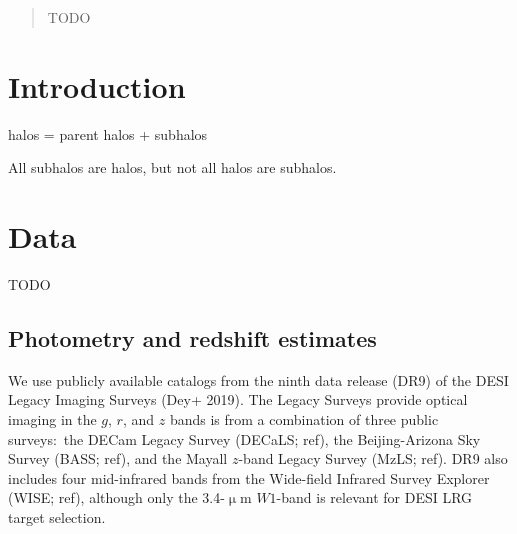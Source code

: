 \documentclass[twocolumn,apj,iop,tighten]{emulateapj2}
\begin{document}
\title{}

\author{Angela M.\ Berti,
}
	

\begin{abstract}
TODO
\end{abstract}

\section{Introduction}\label{sec:intro}

halos = parent halos + subhalos

All subhalos are halos, but not all halos are subhalos.

\section{Data}\label{sec:data}

TODO

\subsection{Photometry and redshift estimates}\label{subsec:photometry}

We use publicly available catalogs from the ninth data release (DR9) of the DESI Legacy Imaging Surveys (Dey+ 2019). The Legacy Surveys provide optical imaging in the $g$, $r$, and $z$ bands is from a combination of three public surveys:\ the DECam Legacy Survey (DECaLS; ref),
the Beijing-Arizona Sky Survey (BASS; ref),
and the Mayall $z$-band Legacy Survey (MzLS; ref).
DR9 also includes four mid-infrared bands from the Wide-field Infrared Survey Explorer (WISE; ref), although only the 3.4-$\upmu$m $W1$-band is relevant for DESI LRG target selection.
\end{document}
